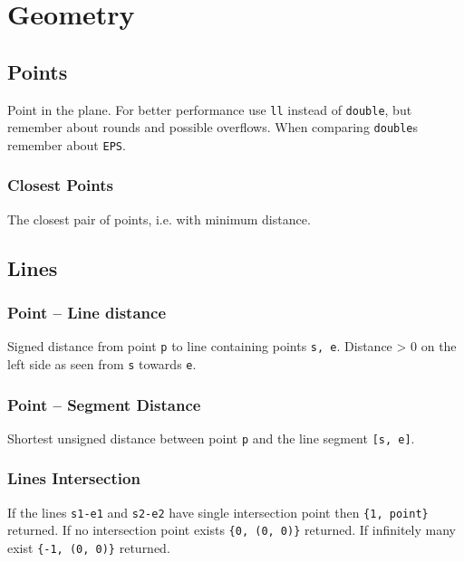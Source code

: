\section{Geometry}

\subsection{Points}

Point in the plane. For better performance use \verb|ll| instead of \verb|double|, but remember about rounds and possible overflows. When comparing \verb|double|s remember about \verb|EPS|.

\subsubsection{Closest Points}

The closest pair of points, i.e. with minimum distance.

\subsection{Lines}

\subsubsection{Point -- Line distance}

Signed distance from point \verb|p| to line containing points \verb|s, e|. Distance > 0 on the left side as seen from \verb|s| towards \verb|e|.

\subsubsection{Point -- Segment Distance}

Shortest unsigned distance between point \verb|p| and the line segment \verb|[s, e]|.

\subsubsection{Lines Intersection}

If the lines \verb|s1-e1| and \verb|s2-e2| have single intersection point then \verb|{1, point}| returned. If no intersection point exists \verb|{0, (0, 0)}| returned. If infinitely many exist \verb|{-1, (0, 0)}| returned.

